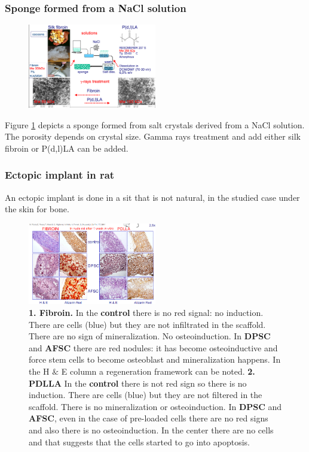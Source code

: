         \subsubsection{Sponge formed from a NaCl solution}

        \begin{figure}[h]
            \centering
            \includegraphics[width=0.5\textwidth]{salt}
            \caption{\label{fig:salt}}
        \end{figure}

        Figure \ref{fig:salt} depicts a sponge formed from salt crystals derived from a NaCl solution.
        The porosity depends on crystal size.
        Gamma rays treatment and add either silk fibroin or P(d,l)LA can be added.

        \subsubsection{Ectopic implant in rat}
        An ectopic implant is done in a sit that is not natural, in the studied case under the skin for bone.

        \begin{figure}[H]
            \centering
            \includegraphics[width=0.5\textwidth]{implant_fibroin.png}
            \caption{\label{fig:implant_fibroin} \textbf{1. Fibroin.} In the \textbf{control} there is no red signal: no induction. There are cells (blue) but they are not infiltrated in the scaffold. There are no sign of mineralization. No osteoinduction. In \textbf{DPSC} and \textbf{AFSC} there are red nodules: it has become osteoinductive and force stem cells to become osteoblast and mineralization happens. In the H $\&$ E column a regeneration framework can be noted. \textbf{2. PDLLA} In the \textbf{control} there is not red sign so there is no induction. There are cells (blue) but they are not filtered in the scaffold. There is no mineralization or osteoinduction. In \textbf{DPSC} and \textbf{AFSC}, even in the case of pre-loaded cells there are no red signs and also there is no osteoinduction. In the center there are no cells and that suggests that the cells started to go into apoptosis.}
        \end{figure}

